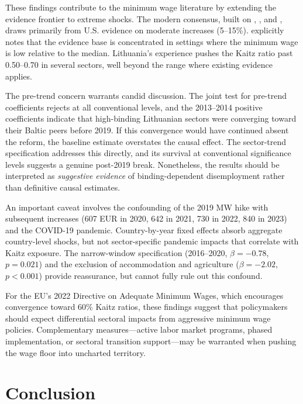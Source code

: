 \documentclass[12pt]{article}
\begin{document}
These findings contribute to the minimum wage literature by extending the evidence frontier to extreme shocks. The modern consensus, built on \citet{card1994minimum}, \citet{dube2010minimum}, and \citet{cengiz2019effect}, draws primarily from U.S. evidence on moderate increases (5--15\%). \citet{manning2021elusive} explicitly notes that the evidence base is concentrated in settings where the minimum wage is low relative to the median. Lithuania's experience pushes the Kaitz ratio past 0.50--0.70 in several sectors, well beyond the range where existing evidence applies.

The pre-trend concern warrants candid discussion. The joint test for pre-trend coefficients rejects at all conventional levels, and the 2013--2014 positive coefficients indicate that high-binding Lithuanian sectors were converging toward their Baltic peers before 2019. If this convergence would have continued absent the reform, the baseline estimate overstates the causal effect. The sector-trend specification addresses this directly, and its survival at conventional significance levels suggests a genuine post-2019 break. Nonetheless, the results should be interpreted as \textit{suggestive evidence} of binding-dependent disemployment rather than definitive causal estimates.

An important caveat involves the confounding of the 2019 MW hike with subsequent increases (607 EUR in 2020, 642 in 2021, 730 in 2022, 840 in 2023) and the COVID-19 pandemic. Country-by-year fixed effects absorb aggregate country-level shocks, but not sector-specific pandemic impacts that correlate with Kaitz exposure. The narrow-window specification (2016--2020, $\beta = -0.78$, $p = 0.021$) and the exclusion of accommodation and agriculture ($\beta = -2.02$, $p < 0.001$) provide reassurance, but cannot fully rule out this confound.

For the EU's 2022 Directive on Adequate Minimum Wages, which encourages convergence toward 60\% Kaitz ratios, these findings suggest that policymakers should expect differential sectoral impacts from aggressive minimum wage policies. Complementary measures---active labor market programs, phased implementation, or sectoral transition support---may be warranted when pushing the wage floor into uncharted territory.

\section{Conclusion}
\end{document}
